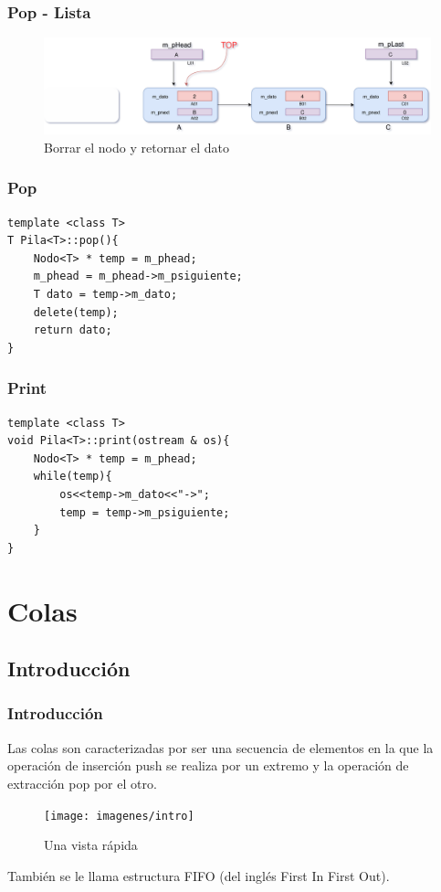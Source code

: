 \documentclass{beamer}
\begin{document}
\begin{frame}
    \frametitle{Pop - Lista}
    
    \begin{figure}
    \includegraphics[width =1 \textwidth]{images/pop03}
    \caption{Borrar el nodo y retornar el dato}
    \end{figure}
       
\end{frame}

\begin{frame}[fragile]  
\frametitle{Pop}
\begin{verbatim}
template <class T>
T Pila<T>::pop(){
	Nodo<T> * temp = m_phead;
	m_phead = m_phead->m_psiguiente;
	T dato = temp->m_dato;
	delete(temp);
	return dato;
}

\end{verbatim}
\end{frame}  


\begin{frame}[fragile]
\frametitle{Print}
\begin{verbatim}
template <class T>
void Pila<T>::print(ostream & os){
	Nodo<T> * temp = m_phead;
	while(temp){
		os<<temp->m_dato<<"->";
		temp = temp->m_psiguiente;
	}
}
\end{verbatim}
\end{frame}  



\section {Colas}
\subsection{Introducción}

\begin{frame}
    \frametitle{Introducción}
    Las colas son caracterizadas por ser una secuencia de elementos en la que la operación de inserción push se realiza por un extremo y la operación de extracción pop por el otro.
    \begin{figure}
    \texttt{[image: imagenes/intro]}
    \caption{Una vista rápida}
    \end{figure}
       También se le llama estructura FIFO (del inglés First In First Out).
\end{frame}
\end{document}
